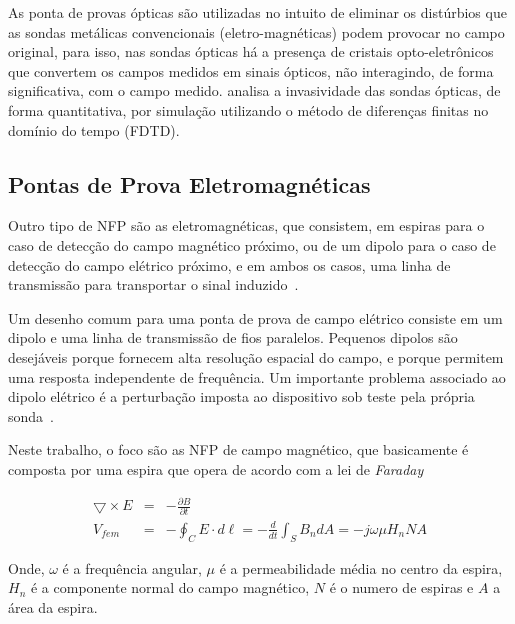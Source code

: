 As ponta de provas ópticas são utilizadas no intuito de eliminar os distúrbios que as sondas metálicas convencionais (eletro-magnéticas) podem provocar no campo original, para isso, nas sondas ópticas há a presença de cristais opto-eletrônicos que convertem os campos medidos em sinais ópticos, não interagindo, de forma significativa, com o campo medido.  analisa a invasividade das sondas ópticas, de forma quantitativa, por simulação utilizando o método de diferenças finitas no domínio do tempo (FDTD). 

\subsection{Pontas de Prova Eletromagnéticas}
Outro tipo de NFP são as eletromagnéticas, que consistem, em espiras para o caso de detecção do campo magnético próximo, ou de um dipolo para o caso de detecção do campo elétrico próximo, e em ambos os casos, uma linha de transmissão para transportar o sinal induzido~\cite[p.~23]{sivaraman2017}. 

Um desenho comum para uma ponta de prova de campo elétrico consiste em um dipolo e uma linha de transmissão de fios paralelos. Pequenos dipolos são desejáveis ​​porque fornecem alta resolução espacial do campo, e porque permitem uma resposta independente de frequência. Um importante problema associado ao dipolo elétrico é a perturbação imposta ao dispositivo sob teste pela própria sonda~\cite[p.~23]{sivaraman2017}.

Neste trabalho, o foco são as NFP de campo magnético, que basicamente é composta por uma espira que opera de acordo com a lei de \textit{Faraday}

\begin{eqnarray}
\bigtriangledown \times E &=& -\frac{\partial B }{\partial t} \nonumber\\
V_{fem} &=& - \oint_C {E \cdot d\ell = - \frac{d}{{dt}}} \int_S {B_n dA} = -j\omega \mu H_nNA \label{FaradayLaw}
\end{eqnarray}

Onde, $\omega$ é a frequência angular, $\mu$ é a permeabilidade média no centro da espira, $H_n$ é a componente normal do campo magnético, $N$ é o numero de espiras e $A$ a área da espira. 


